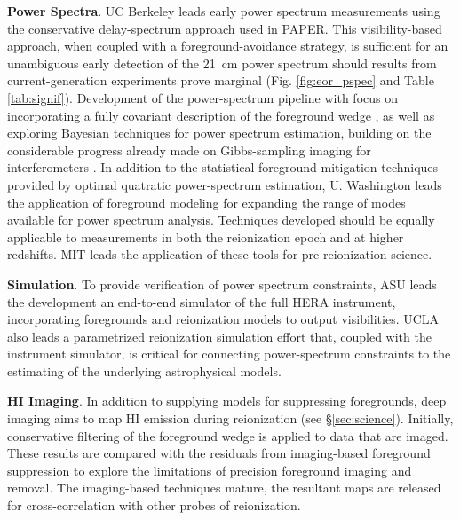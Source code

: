 \documentclass[preprint]{aastex}
\newcommand{\compress}{\vspace{-0.3in}}
\begin{document}


{\bf Power Spectra}. UC Berkeley leads early power spectrum measurements using the conservative
delay-spectrum approach used in PAPER.  This
visibility-based approach, when coupled with a foreground-avoidance strategy,
is sufficient for an unambiguous early detection of the 21~cm
power spectrum should results from current-generation experiments prove
marginal (Fig. \ref{fig:eor_pspec} and Table \ref{tab:signif}).  Development of
the power-spectrum pipeline with focus on incorporating
a fully covariant description of the foreground wedge
\citep{liu_tegmark2011,dillon_et_al2013a}, as well as
exploring Bayesian techniques for power spectrum estimation, building on the considerable
progress already made on Gibbs-sampling imaging for interferometers \citep{sutter_et_al2014}.
In addition to the statistical foreground mitigation techniques provided by optimal quatratic
power-spectrum estimation, U. Washington leads the application of 
foreground modeling for expanding the range of modes available for power spectrum analysis.
Techniques developed should be equally applicable
to measurements in both the reionization epoch and at higher redshifts.  MIT leads the application
of these tools for pre-reionization science.

{\bf Simulation}. To provide verification of power spectrum constraints, ASU leads the
development an end-to-end simulator of the full HERA instrument, incorporating
foregrounds and reionization models to output visibilities.  UCLA also leads
a parametrized reionization simulation effort that, coupled with the instrument
simulator, is critical for connecting power-spectrum constraints to the estimating
of the underlying astrophysical models.


{\bf HI Imaging}. In addition to supplying models for suppressing foregrounds,
deep imaging aims to map HI emission during reionization (see \S\ref{sec:science}).
Initially, conservative filtering of the foreground wedge is applied to data that
are imaged.  These results are compared with the residuals from imaging-based
foreground suppression to explore the limitations of 
precision foreground imaging and removal.  The imaging-based techniques mature, the resultant
maps are released for cross-correlation with other probes of reionization.
\end{document}
